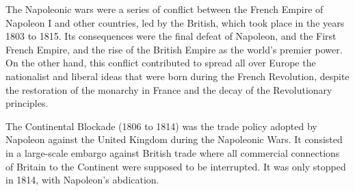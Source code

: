 \documentclass[12pt,a4paper,notitlepage,english]{article}
\begin{document}
The Napoleonic wars were a series of conflict between the French Empire of Napoleon I and  other countries, led by the British, which took place in the years 1803 to 1815. Its consequences were the final defeat of Napoleon, and the First French Empire, and the rise of the British Empire as the world's premier power. On the other hand, this conflict contributed to spread all over Europe the nationalist and liberal ideas that were born during the French Revolution, despite the restoration of the monarchy in France and the decay of the Revolutionary principles. 

The Continental Blockade (1806 to 1814) was the trade policy adopted by Napoleon against the United Kingdom during the Napoleonic Wars. It consisted in a large-scale embargo against British trade where all commercial connections of Britain to the Continent were supposed to be interrupted. It was only stopped in 1814, with Napoleon's abdication. 

%
%
\end{document}
